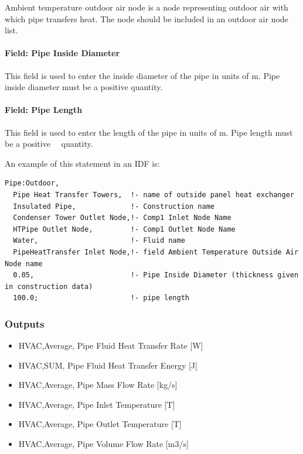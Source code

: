 Ambient temperature outdoor air node is a node representing outdoor air with which pipe transfers heat. The node should be included in an outdoor air node list.

\paragraph{Field: Pipe Inside Diameter}\label{field-pipe-inside-diameter-1}

This field is used to enter the inside diameter of the pipe in units of m. Pipe inside diameter must be a positive quantity.

\paragraph{Field: Pipe Length}\label{field-pipe-length-1}

This field is used to enter the length of the pipe in units of m. Pipe length must be a positive~~ quantity.

An example of this statement in an IDF is:

\begin{lstlisting}
Pipe:Outdoor,
  Pipe Heat Transfer Towers,  !- name of outside panel heat exchanger
  Insulated Pipe,             !- Construction name
  Condenser Tower Outlet Node,!- Comp1 Inlet Node Name
  HTPipe Outlet Node,         !- Comp1 Outlet Node Name
  Water,                      !- Fluid name
  PipeHeatTransfer Inlet Node,!- field Ambient Temperature Outside Air Node name
  0.05,                       !- Pipe Inside Diameter (thickness given in construction data)
  100.0;                      !- pipe length
\end{lstlisting}

\subsubsection{Outputs}\label{outputs-7-005}

\begin{itemize}
\item
  HVAC,Average, Pipe Fluid Heat Transfer Rate {[}W{]}
\item
  HVAC,SUM, Pipe Fluid Heat Transfer Energy {[}J{]}
\item
  HVAC,Average, Pipe Mass Flow Rate {[}kg/s{]}
\item
  HVAC,Average, Pipe Inlet Temperature {[}T{]}
\item
  HVAC,Average, Pipe Outlet Temperature {[}T{]}
\item
  HVAC,Average, Pipe Volume Flow Rate {[}m3/s{]}
\end{itemize}

